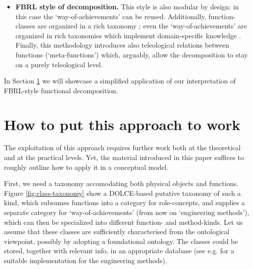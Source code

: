 \documentclass[
]{ceurart}
\begin{document}
\begin{itemize}
  \item \textbf{FBRL style of decomposition.} This style is also modular by design: in this case the `way-of-achievements' can be reused. Additionally, function-classes are organized in a rich taxonomy%
  ; even the `way-of-achievements' are organized in rich taxonomies which implement domain-specific knowledge \cite{kitamuraOntologybasedDescriptionFunctional2003}. Finally, this methodology introduces also teleological relations between functions (`meta-functions') which, arguably, allow the decomposition to stay on a purely teleological level. 
\end{itemize}
In Section \ref{sec:use-case} we will showcase a simplified application of our interpretation of FBRL-style functional decomposition.


\section{How to put this approach to work}\label{sec:use-case}

The exploitation of this approach requires further work both at the theoretical and at the practical levels. Yet, the material introduced in this paper suffices to roughly outline how to apply it in a conceptual model.

First, we need a taxonomy accomodating both physical objects and functions. Figure \ref{fig:class-taxonomy} show a DOLCE-based \cite{borgoDOLCEDescriptiveOntology2022} putative taxonomy of such a kind, which subsumes functions into a category for role-concepts, and %
supplies a separate category for `way-of-achievements' (from now on `engineering methods'), which can then be specialized into different function- and method-kinds. Let us assume that these classes are sufficiently characterised from the ontological viewpoint, possibly by adopting a foundational ontology. %
The classes could be stored, together with relevant info, in an appropriate database (see e.g. \cite{kitamuraOntologybasedDescriptionFunctional2003} for a suitable implementation for the engineering methods).
\end{document}
